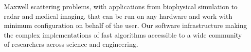 Maxwell scattering problems, with applications from biophysical simulation to radar and medical imaging, that can be run on any hardware and work with minimum configuration on behalf of the user. Our software infrastructure making the complex implementations of fast algorithms accessible to a wide community of researchers across science and engineering.